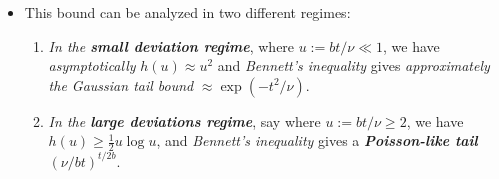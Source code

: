 \documentclass[11pt]{article}
\begin{document}
\begin{itemize}
\item \begin{remark} This bound can be analyzed in two different regimes:
\begin{enumerate}
\item \emph{In the \textbf{small deviation regime}}, where $u := b t/ \nu \ll 1$, we have \emph{asymptotically} $h(u) \approx u^2$ and \emph{Bennett's inequality} gives \emph{approximately the Gaussian tail bound} $\approx \exp(-t^2/\nu)$. 

\item \emph{In the \textbf{large deviations regime}}, say where $u := b t/ \nu \ge 2$, we have $h(u) \ge \frac{1}{2}u \log u$, and \emph{Bennett's inequality} gives a \emph{\textbf{Poisson-like tail}} $(\nu/bt)^{t/2 b}$.
\end{enumerate}
\end{remark}
\end{itemize}
\end{document}
